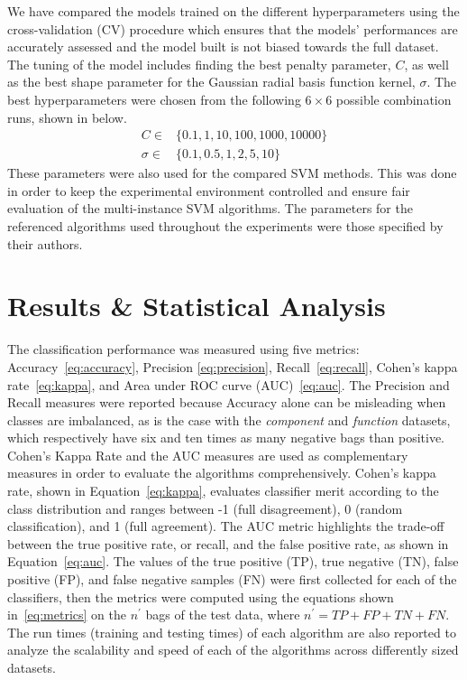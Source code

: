 \documentclass[reqno]{vcuthesis}
\numberwithin{equation}{chapter}
\begin{document}
We have compared the models trained on the different hyperparameters using the cross-validation (CV) procedure which ensures that the models’ performances are accurately assessed and the model built is not biased towards the full dataset. The tuning of the model includes finding the best penalty parameter, $C$, as well as the best shape parameter for the Gaussian radial basis function kernel, $\sigma$. The best hyperparameters were chosen from the following $6 \times 6$ possible combination runs, shown in below.
\begin{subequations}
\begin{align*}
C \in  & \{0.1, 1, 10, 100, 1000, 10000\} \\
\sigma \in  & \{0.1, 0.5, 1, 2, 5, 10\} 
\end{align*}
\end{subequations}
These parameters were also used for the compared SVM methods. This was done in order to keep the experimental environment controlled and ensure fair evaluation of the multi-instance SVM algorithms. The parameters for the referenced algorithms used throughout the experiments were those specified by their authors.

\section{Results \& Statistical Analysis}
The classification performance was measured using five metrics: Accuracy~\eqref{eq:accuracy}, Precision \eqref{eq:precision}, Recall~\eqref{eq:recall}, Cohen's kappa rate~\eqref{eq:kappa}, and Area under ROC curve (AUC)~\eqref{eq:auc}. The Precision and Recall measures were reported because Accuracy alone can be misleading when classes are imbalanced, as is the case with the \textit{component} and \textit{function} datasets, which respectively have six and ten times as many negative bags than positive. Cohen's Kappa Rate and the AUC measures are used as complementary measures in order to evaluate the algorithms comprehensively. Cohen's kappa rate, shown in Equation~\eqref{eq:kappa}, evaluates classifier merit according to the class distribution and ranges between -1 (full disagreement), 0 (random classification), and 1 (full agreement). The AUC metric highlights the trade-off between the true positive rate, or recall, and the false positive rate, as shown in Equation~\eqref{eq:auc}. The values of the true positive (TP), true negative (TN), false positive (FP), and false negative samples (FN) were first collected for each of the classifiers, then the metrics were computed using the equations shown in~\eqref{eq:metrics} on the $n^\prime$ bags of the test data, where $n^\prime = TP + FP + TN + FN$. The run times (training and testing times) of each algorithm are also reported to analyze the scalability and speed of each of the algorithms across differently sized datasets. 
\end{document}
